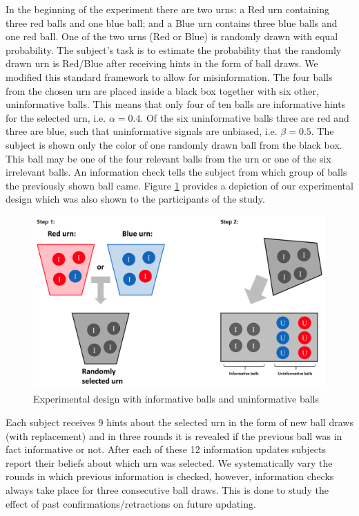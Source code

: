 \documentclass{article}
\begin{document}
In the beginning of the experiment there are two urns: a Red urn containing three red balls and one blue ball; and a Blue urn contains three blue balls and one red ball. One of the two urns (Red or Blue) is randomly drawn with equal probability. The subject's task is to estimate the probability that the randomly drawn urn is Red/Blue after receiving hints in the form of ball draws. We modified this standard framework to allow for misinformation. The four balls from the chosen urn are placed inside a black box together with six other, uninformative balls. This means that only four of ten balls are informative hints for the selected urn, i.e. $\alpha=0.4$. Of the six uninformative balls three are red and three are blue, such that uninformative signals are unbiased, i.e. $\beta=0.5$. The subject is shown only the color of one randomly drawn ball from the black box. This ball may be one of the four relevant balls from the urn or one of the six irrelevant balls. An information check tells the subject from which group of balls the previously shown ball came. Figure \ref{fig:instructions} provides a depiction of our experimental design which was also shown to the participants of the study.

\begin{figure}[!htb]
    \centering
    \includegraphics[width = 12cm]{Fig/instructions.png}
    \caption{Experimental design with informative balls and uninformative balls}
    \label{fig:instructions}
\end{figure}

Each subject receives 9 hints about the selected urn in the form of new ball draws (with replacement) and in three rounds it is revealed if the previous ball was in fact informative or not. After each of these 12 information updates subjects report their beliefs about which urn was selected. We systematically vary the rounds in which previous information is checked, however, information checks always take place for three consecutive ball draws. This is done to study the effect of past confirmations/retractions on future updating.
\end{document}
